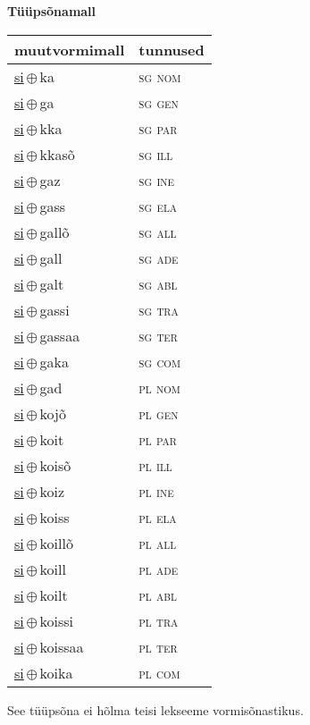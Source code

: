 

\vspace{3.5em}
\noindent \begin{minipage}{\textwidth}
\noindent \textbf{Tüüpsõnamall \,}\\

\begin{sideways}
\begin{tabular}{l l}
muutvormimall & tunnused \\
\hline
\underline{si}\,$\oplus$\,ka & \textsc{ sg nom } \\
\underline{si}\,$\oplus$\,ga & \textsc{ sg gen } \\
\underline{si}\,$\oplus$\,kka & \textsc{ sg par } \\
\underline{si}\,$\oplus$\,kkasõ & \textsc{ sg ill } \\
\underline{si}\,$\oplus$\,gaz & \textsc{ sg ine } \\
\underline{si}\,$\oplus$\,gass & \textsc{ sg ela } \\
\underline{si}\,$\oplus$\,gallõ & \textsc{ sg all } \\
\underline{si}\,$\oplus$\,gall & \textsc{ sg ade } \\
\underline{si}\,$\oplus$\,galt & \textsc{ sg abl } \\
\underline{si}\,$\oplus$\,gassi & \textsc{ sg tra } \\
\underline{si}\,$\oplus$\,gassaa & \textsc{ sg ter } \\
\underline{si}\,$\oplus$\,gaka & \textsc{ sg com } \\
\underline{si}\,$\oplus$\,gad & \textsc{ pl nom } \\
\underline{si}\,$\oplus$\,kojõ & \textsc{ pl gen } \\
\underline{si}\,$\oplus$\,koit & \textsc{ pl par } \\
\underline{si}\,$\oplus$\,koisõ & \textsc{ pl ill } \\
\underline{si}\,$\oplus$\,koiz & \textsc{ pl ine } \\
\underline{si}\,$\oplus$\,koiss & \textsc{ pl ela } \\
\underline{si}\,$\oplus$\,koillõ & \textsc{ pl all } \\
\underline{si}\,$\oplus$\,koill & \textsc{ pl ade } \\
\underline{si}\,$\oplus$\,koilt & \textsc{ pl abl } \\
\underline{si}\,$\oplus$\,koissi & \textsc{ pl tra } \\
\underline{si}\,$\oplus$\,koissaa & \textsc{ pl ter } \\
\underline{si}\,$\oplus$\,koika & \textsc{ pl com } \\
\end{tabular}
\end{sideways}
\label{tab:tüüpsõnamall-sika}

\end{minipage}

 
\vspace{1em}
\noindent See tüüpsõna ei hõlma teisi lekseeme vormi\-sõnastikus.
